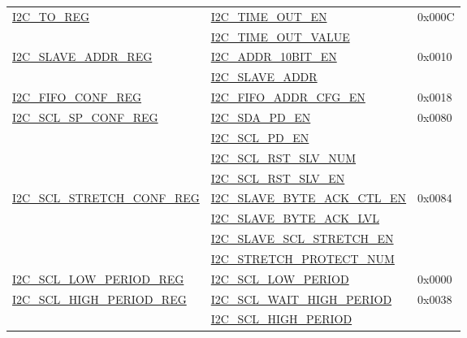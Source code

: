 \documentclass[main\_\_EN.tex]{subfiles}
\begin{document}
\begin{longtable}{ | p{6cm} | p{7cm} | p{2cm} | }
\multirow{2}{*}{\hyperref[regdesc:I2CTOREG]{I2C\_TO\_REG}} & {\hyperref[fielddesc:I2CTIMEOUTEN]{I2C\_TIME\_OUT\_EN}} & \multirow{2}{*}{0x000C}  \\\cline{2-2}
& {\hyperref[fielddesc:I2CTIMEOUTVALUE]{I2C\_TIME\_OUT\_VALUE}}& \\ \hline

\multirow{2}{*}{\hyperref[regdesc:I2CSLAVEADDRREG]{I2C\_SLAVE\_ADDR\_REG}} & {\hyperref[fielddesc:I2CADDR10BITEN]{I2C\_ADDR\_10BIT\_EN}} & \multirow{2}{*}{0x0010} \\\cline{2-2}
& {\hyperref[fielddesc:I2CSLAVEADDR]{I2C\_SLAVE\_ADDR}}& \\ \hline


\hyperref[regdesc:I2CFIFOCONFREG]{I2C\_FIFO\_CONF\_REG} & {\hyperref[fielddesc:I2CFIFOADDRCFGEN]{I2C\_FIFO\_ADDR\_CFG\_EN}} & 0x0018 \\ \hline

\multirow{4}{*}{\hyperref[regdesc:I2CSCLSPCONFREG]{I2C\_SCL\_SP\_CONF\_REG}} & {\hyperref[fielddesc:I2CSDAPDEN]{I2C\_SDA\_PD\_EN}} & \multirow{4}{*}{0x0080}  \\\cline{2-2}
& {\hyperref[fielddesc:I2CSCLPDEN]{I2C\_SCL\_PD\_EN}}& \\\cline{2-2}
& {\hyperref[fielddesc:I2CSCLRSTSLVNUM]{I2C\_SCL\_RST\_SLV\_NUM}}& \\\cline{2-2}
& {\hyperref[fielddesc:I2CSCLRSTSLVEN]{I2C\_SCL\_RST\_SLV\_EN}}& \\ \hline

\multirow{4}{*}{\hyperref[regdesc:I2CSCLSTRETCHCONFREG]{I2C\_SCL\_STRETCH\_CONF\_REG}} & {\hyperref[fielddesc:I2CSLAVEBYTEACKCTLEN]{I2C\_SLAVE\_BYTE\_ACK\_CTL\_EN}} & \multirow{4}{*}{0x0084}  \\\cline{2-2}
& {\hyperref[fielddesc:I2CSLAVEBYTEACKLVL]{I2C\_SLAVE\_BYTE\_ACK\_LVL}}& \\\cline{2-2}
& {\hyperref[fielddesc:I2CSLAVESCLSTRETCHEN]{I2C\_SLAVE\_SCL\_STRETCH\_EN}}& \\\cline{2-2}
& {\hyperref[fielddesc:I2CSTRETCHPROTECTNUM]{I2C\_STRETCH\_PROTECT\_NUM}}& \\ \hline

\hyperref[regdesc:I2CSCLLOWPERIODREG]{I2C\_SCL\_LOW\_PERIOD\_REG} & \hyperref[fielddesc:I2CSCLLOWPERIOD]{I2C\_SCL\_LOW\_PERIOD} & 0x0000  \\ \hline

\multirow{2}{*}{\hyperref[regdesc:I2CSCLHIGHPERIODREG]{I2C\_SCL\_HIGH\_PERIOD\_REG}} & \hyperref[fielddesc:I2CSCLWAITHIGHPERIOD]{I2C\_SCL\_WAIT\_HIGH\_PERIOD} & \multirow{2}{*}{0x0038}  \\\cline{2-2}
& \hyperref[fielddesc:I2CSCLHIGHPERIOD]{I2C\_SCL\_HIGH\_PERIOD}& \\ \hline


\end{longtable}
\end{document}
